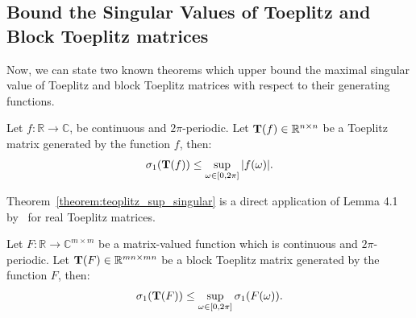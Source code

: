 \subsection{Bound the Singular Values of Toeplitz and Block Toeplitz matrices}
\label{subsection:ch2-bound_the_singular_values_of_toeplitz_and_block_toeplitz_matrices}

Now, we can state two known theorems which upper bound the maximal singular value of Toeplitz and block Toeplitz matrices with respect to their generating functions.

\begin{theorem} \label{theorem:teoplitz_sup_singular}
  Let $f: \mathbb{R} \rightarrow \mathbb{C}$, be continuous and $2\pi$-periodic. Let $\mathbf{T}(f) \in \mathbb{R}^{n \times n}$ be a Toeplitz matrix generated by the function $f$, then:
  \begin{align}
    \sigma_1 \left( \Tmat(f) \right) \leq \sup_{\omega \in [0, 2\pi]} |f(\omega)|.
  \end{align}
\end{theorem}

Theorem~\ref{theorem:teoplitz_sup_singular} is a direct application of Lemma 4.1 by~\citet{gray2006toeplitz} for real Toeplitz matrices. 
\begin{theorem} \label{theorem:block_teoplitz_sup_singular}
  Let $F: \mathbb{R} \rightarrow \mathbb{C}^{m \times m}$ be a matrix-valued function which is continuous and $2 \pi$-periodic.
  Let $\mathbf{T}(F) \in \mathbb{R}^{mn \times mn}$ be a block Toeplitz matrix generated by the function $F$, then:
  \begin{align}
    \sigma_1 \left( \Tmat(F) \right) \leq \sup_{\omega \in [0, 2\pi]} \sigma_1 \left( F\left( \omega \right) \right) .
  \end{align}
\end{theorem}







